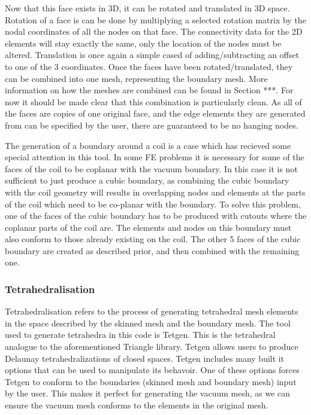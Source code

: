 \documentclass[12pt, letterpaper]{article}
\begin{document}
Now that this face exists in 3D, it can be rotated and translated in 3D space. Rotation of a face is can be done by multiplying a selected rotation matrix by the nodal coordinates of all the nodes on that face. The connectivity data for the 2D elements will stay exactly the same, only the location of the nodes must be altered. Translation is once again a simple cased of adding/subtracting an offset to one of the 3 coordinates. Once the faces have been rotated/translated, they can be combined into one mesh, representing the boundary mesh. More information on how the meshes are combined can be found in Section ***. For now it should be made clear that this combination is particularly clean. As all of the faces are copies of one original face, and the edge elements they are generated from can be specified by the user, there are guaranteed to be no hanging nodes.

The generation of a boundary around a coil is a case which has recieved some special attention in this tool. In some FE problems it is necessary for some of the faces of the coil to be coplanar with the vacuum boundary. In this case it is not sufficient to just produce a cubic boundary, as combining the cubic boundary with the coil geometry will results in overlapping nodes and elements at the parts of the coil which need to be co-planar with the boundary. To solve this problem, one of the faces of the cubic boundary has to be produced with cutouts where the coplanar parts of the coil are. The elements and nodes on this boundary must also conform to those already existing on the coil. The other 5 faces of the cubic boundary are created as described prior, and then combined with the remaining one.

\subsubsection{Tetrahedralisation}
Tetrahedralisation refers to the process of generating tetrahedral mesh elements in the space described by the skinned mesh and the boundary mesh. The tool used to generate tetrahedra in this code is Tetgen. This is the tetrahedral analogue to the aforementioned Triangle library. Tetgen allows users to produce Delaunay tetrahedralizations of closed spaces. Tetgen includes many built it options that can be used to manipulate its behavoir. One of these options forces Tetgen to conform to the boundaries (skinned mesh and boundary mesh) input by the user. This makes it perfect for generating the vacuum mesh, as we can ensure the vacuum mesh conforms to the elements in the original mesh. 
\end{document}
